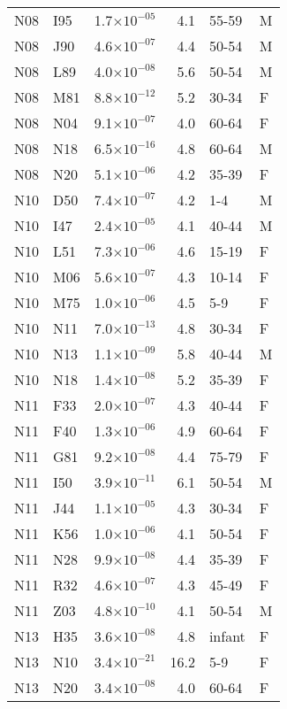\begin{longtable}{lllrll}
   N08 & I95 & 1.7$\times10^{-05}$ & 4.1 & 55-59 & M \\ 
   N08 & J90 & 4.6$\times10^{-07}$ & 4.4 & 50-54 & M \\ 
   N08 & L89 & 4.0$\times10^{-08}$ & 5.6 & 50-54 & M \\ 
   N08 & M81 & 8.8$\times10^{-12}$ & 5.2 & 30-34 & F \\ 
   N08 & N04 & 9.1$\times10^{-07}$ & 4.0 & 60-64 & F \\ 
   N08 & N18 & 6.5$\times10^{-16}$ & 4.8 & 60-64 & M \\ 
   N08 & N20 & 5.1$\times10^{-06}$ & 4.2 & 35-39 & F \\ 
   N10 & D50 & 7.4$\times10^{-07}$ & 4.2 & 1-4 & M \\ 
   N10 & I47 & 2.4$\times10^{-05}$ & 4.1 & 40-44 & M \\ 
   N10 & L51 & 7.3$\times10^{-06}$ & 4.6 & 15-19 & F \\ 
   N10 & M06 & 5.6$\times10^{-07}$ & 4.3 & 10-14 & F \\ 
   N10 & M75 & 1.0$\times10^{-06}$ & 4.5 & 5-9 & F \\ 
   N10 & N11 & 7.0$\times10^{-13}$ & 4.8 & 30-34 & F \\ 
   N10 & N13 & 1.1$\times10^{-09}$ & 5.8 & 40-44 & M \\ 
   N10 & N18 & 1.4$\times10^{-08}$ & 5.2 & 35-39 & F \\ 
   N11 & F33 & 2.0$\times10^{-07}$ & 4.3 & 40-44 & F \\ 
   N11 & F40 & 1.3$\times10^{-06}$ & 4.9 & 60-64 & F \\ 
   N11 & G81 & 9.2$\times10^{-08}$ & 4.4 & 75-79 & F \\ 
   N11 & I50 & 3.9$\times10^{-11}$ & 6.1 & 50-54 & M \\ 
   N11 & J44 & 1.1$\times10^{-05}$ & 4.3 & 30-34 & F \\ 
   N11 & K56 & 1.0$\times10^{-06}$ & 4.1 & 50-54 & F \\ 
   N11 & N28 & 9.9$\times10^{-08}$ & 4.4 & 35-39 & F \\ 
   N11 & R32 & 4.6$\times10^{-07}$ & 4.3 & 45-49 & F \\ 
   N11 & Z03 & 4.8$\times10^{-10}$ & 4.1 & 50-54 & M \\ 
   N13 & H35 & 3.6$\times10^{-08}$ & 4.8 & infant & F \\ 
   N13 & N10 & 3.4$\times10^{-21}$ & 16.2 & 5-9 & F \\ 
   N13 & N20 & 3.4$\times10^{-08}$ & 4.0 & 60-64 & F \\ 

\end{longtable}
